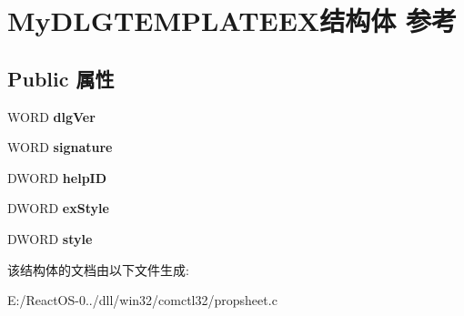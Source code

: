 \hypertarget{struct_my_d_l_g_t_e_m_p_l_a_t_e_e_x}{}\section{My\+D\+L\+G\+T\+E\+M\+P\+L\+A\+T\+E\+E\+X结构体 参考}
\label{struct_my_d_l_g_t_e_m_p_l_a_t_e_e_x}
\subsection*{Public 属性}
\begin{DoxyCompactItemize}
\item 
\mbox{\label{struct_my_d_l_g_t_e_m_p_l_a_t_e_e_x_a26c1a099702dff630374632239f54569}} 
W\+O\+RD {\bfseries dlg\+Ver}
\item 
\mbox{\label{struct_my_d_l_g_t_e_m_p_l_a_t_e_e_x_a9ecdb86c62e9031b54e03be6bb0065e0}} 
W\+O\+RD {\bfseries signature}
\item 
\mbox{\label{struct_my_d_l_g_t_e_m_p_l_a_t_e_e_x_a14efa14bd9656e8117469a1e6cc26566}} 
D\+W\+O\+RD {\bfseries help\+ID}
\item 
\mbox{\label{struct_my_d_l_g_t_e_m_p_l_a_t_e_e_x_a3ad3488b42e26bdb5ce8753b223bffaa}} 
D\+W\+O\+RD {\bfseries ex\+Style}
\item 
\mbox{\label{struct_my_d_l_g_t_e_m_p_l_a_t_e_e_x_ad57d61f93a2f50f882defbef40779503}} 
D\+W\+O\+RD {\bfseries style}
\end{DoxyCompactItemize}


该结构体的文档由以下文件生成\+:\begin{DoxyCompactItemize}
\item 
E\+:/\+React\+O\+S-\/0../dll/win32/comctl32/propsheet.\+c\end{DoxyCompactItemize}
